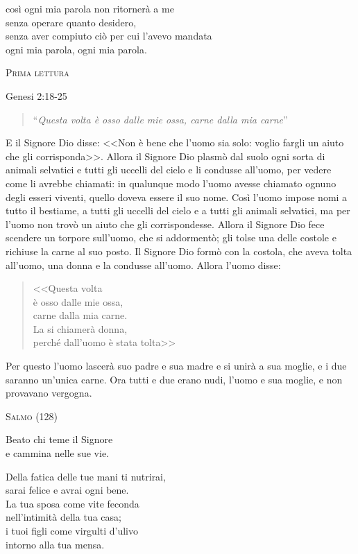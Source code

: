 \documentclass[12pt,twoside]{article}
\newcommand{\masssubpart}[1]{\bigskip

  {\large\scshape #1}}
\newcommand{\reading}[1]{#1}
\newcommand{\readingquote}[1]{
\begin{quote}
``\textit{#1}''
\end{quote}
}
\begin{document}
così ogni mia parola non ritornerà a me\\
senza operare quanto desidero,\\
senza aver compiuto ciò per cui l'avevo mandata\\
ogni mia parola, ogni mia parola.

\newpage

\masssubpart{Prima lettura}

\reading{Genesi 2:18-25}
\readingquote{Questa volta è osso dalle mie ossa, carne dalla mia carne}

E il Signore Dio disse: <<Non è bene che l'uomo sia solo: voglio fargli un aiuto che gli corrisponda>>. Allora il Signore Dio plasmò dal suolo ogni sorta di animali selvatici e tutti gli uccelli del cielo e li condusse all'uomo, per vedere come li avrebbe chiamati: in qualunque modo l'uomo avesse chiamato ognuno degli esseri viventi, quello doveva essere il suo nome. Così l'uomo impose nomi a tutto il bestiame, a tutti gli uccelli del cielo e a tutti gli animali selvatici, ma per l'uomo non trovò un aiuto che gli corrispondesse. Allora il Signore Dio fece scendere un torpore sull'uomo, che si addormentò; gli tolse una delle costole e richiuse la carne al suo posto. Il Signore Dio formò con la costola, che aveva tolta all'uomo, una donna e la condusse all'uomo. Allora l'uomo disse:
\begin{quote}
<<Questa volta\\
è osso dalle mie ossa,\\
carne dalla mia carne.\\
La si chiamerà donna,\\
perché dall'uomo è stata tolta>>
\end{quote}
Per questo l'uomo lascerà suo padre e sua madre e si unirà a sua moglie, e i due saranno un'unica carne.
Ora tutti e due erano nudi, l'uomo e sua moglie, e non provavano vergogna.

\newpage

\masssubpart{Salmo (128)}

Beato chi teme il Signore\\
e cammina nelle sue vie.

Della fatica delle tue mani ti nutrirai,\\
sarai felice e avrai ogni bene.\\
La tua sposa come vite feconda\\
nell'intimità della tua casa;\\
i tuoi figli come virgulti d'ulivo\\
intorno alla tua mensa.
\end{document}
